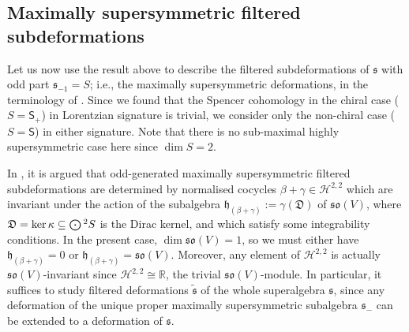 \documentclass[10pt,a4paper]{amsart}
\numberwithin{equation}{section}
\newcommand{\fh}{\mathfrak{h}}
\newcommand{\fs}{\mathfrak{s}}
\newcommand{\fso}{\mathfrak{so}}
\newcommand{\fD}{\mathfrak{D}}
\newcommand{\RR}{\mathbb{R}}
\newcommand{\cH}{\mathcal{H}}
\newcommand{\ssS}{\mathsf{S}}
\newcommand{\fstilde}{\widetilde{\fs}}
\newcommand{\Odot}{\mathchoice{{\textstyle\bigodot}}{\bigodot}{\bigodot}{\bigodot}}
\newcommand{\1}{\mathbbm{1}}
\begin{document}
\subsection{Maximally supersymmetric filtered subdeformations}
\label{sec:2d-max-susy-subdef}

Let us now use the result above to describe the filtered subdeformations of $\fs$ with odd part ${\fs_{-1}=S}$; i.e., the maximally supersymmetric deformations, in the terminology of \cite[Definition~4.10]{Beckett2024_2}. Since we found that the Spencer cohomology in the chiral case ($S=\ssS_+$) in Lorentzian signature is trivial, we consider only the non-chiral case ($S=\ssS$) in either signature. Note that there is no sub-maximal highly supersymmetric case here since $\dim S=2$.

In \cite[Section~4.5.5]{Beckett2024_2}, it is argued that odd-generated maximally supersymmetric filtered subdeformations are determined by normalised cocycles $\beta+\gamma\in\cH^{2,2}$ which are invariant under the action of the subalgebra $\fh_{(\beta+\gamma)}:=\gamma(\fD)$ of $\fso(V)$, where $\fD=\ker\kappa\subseteq\Odot^2 S$ is the Dirac kernel, and which satisfy some integrability conditions. In the present case, $\dim\fso(V)=1$, so we must either have $\fh_{(\beta+\gamma)}=0$ or $\fh_{(\beta+\gamma)}=\fso(V)$. Moreover, any element of $\cH^{2,2}$ is actually $\fso(V)$-invariant since $\cH^{2,2}\cong\RR$, the trivial $\fso(V)$-module. In particular, it suffices to study filtered deformations $\fstilde$ of the whole superalgebra $\fs$, since any deformation of the unique proper maximally supersymmetric subalgebra $\fs_-$ can be extended to a deformation of $\fs$.
\end{document}
